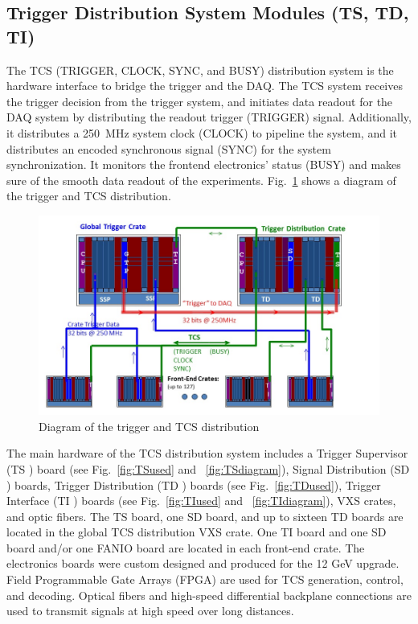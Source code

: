 \subsection{Trigger Distribution System Modules (TS, TD, TI)}
	
The TCS (TRIGGER, CLOCK, SYNC, and BUSY) distribution system \cite{tcs-ref} is the hardware interface to bridge the trigger and the DAQ.  The TCS system receives the trigger decision from the trigger system, and initiates data readout for the DAQ system by distributing the readout trigger (TRIGGER) signal.  Additionally, it distributes a 250~MHz system clock (CLOCK) to pipeline the system, and it distributes an encoded synchronous signal (SYNC) for the system synchronization.  It monitors the frontend electronics’ status (BUSY) and makes sure of the smooth data readout of the experiments. Fig.~\ref{fig:TCSdiagram} shows a diagram of the trigger and TCS distribution.

\begin{figure}[hbt]
	\centering
	\includegraphics[width=1.0\columnwidth,keepaspectratio]{img/TCSdiagram.jpg}
	\caption{Diagram of the trigger and TCS distribution}
	\label{fig:TCSdiagram}
\end{figure}


The main hardware of the TCS distribution system includes a Trigger Supervisor (TS \cite{ts-ref}) board (see Fig.~\ref{fig:TSused} and ~\ref{fig:TSdiagram}), Signal Distribution (SD \cite{sd-ref}) boards, Trigger Distribution (TD \cite{td-ref}) boards  (see Fig.~\ref{fig:TDused}), Trigger Interface (TI \cite{ti-ref}) boards  (see Fig.~\ref{fig:TIused} and ~\ref{fig:TIdiagram}), VXS crates, and optic fibers.  The TS board, one SD board, and up to sixteen TD boards are located in the global TCS distribution VXS crate.  One TI board and one SD board and/or one FANIO board are located in each front-end crate.  The electronics boards were custom designed and produced for the 12 GeV upgrade.  Field Programmable Gate Arrays (FPGA) are used for TCS generation, control, and decoding.  Optical fibers and high-speed differential backplane connections are used to transmit signals at high speed over long distances.  

